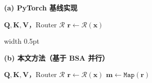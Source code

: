 \begin{algorithm}[t]
    \caption{串行分发（基线）与并行 BSA（本文）对比}
    \label{alg:comparison}
    \centering
    \begin{minipage}[t]{0.48\textwidth}
        \centerline{\textbf{(a) PyTorch 基线实现}}
        \begin{algorithmic}[1]
            \REQUIRE $\mathbf{Q}, \mathbf{K}, \mathbf{V}$，Router $\mathcal{R}$
            \STATE $\mathbf{r} \leftarrow \mathcal{R}(\mathbf{x})$
            \STATE {}
        \end{algorithmic}
    \end{minipage}%
    \hfill \vrule width 0.5pt \hfill
    \begin{minipage}[t]{0.48\textwidth}
        \centerline{\textbf{(b) 本文方法（基于 BSA 并行）}}

        \begin{algorithmic}[1]
            \REQUIRE $\mathbf{Q}, \mathbf{K}, \mathbf{V}$，Router $\mathcal{R}$
            \STATE $\mathbf{r} \leftarrow \mathcal{R}(\mathbf{x})$
            \STATE $\mathbf{m} \leftarrow \texttt{Map}(\mathbf{r})$

            \STATE {}
\end{algorithmic}
\end{minipage}
\end{algorithm}
